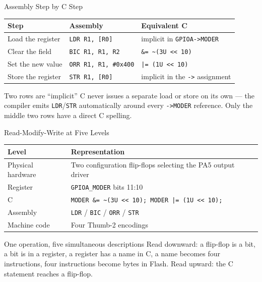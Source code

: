 \documentclass[9pt,aspectratio=169,xcolor=table]{beamer}
\begin{document}
\begin{frame}{Assembly Step by C Step}
    \begin{center}
    {\small
    \striped
    \begin{tabular}{@{}l l l@{}}
        \toprule
        \textbf{Step} & \textbf{Assembly} & \textbf{Equivalent C} \\
        \midrule
        Load the register & \texttt{LDR R1, [R0]} & implicit in \texttt{GPIOA->MODER} \\
        Clear the field & \texttt{BIC R1, R1, R2} & \texttt{\&= \textasciitilde(3U << 10)} \\
        Set the new value & \texttt{ORR R1, R1, \#0x400} & \texttt{|= (1U << 10)} \\
        Store the register & \texttt{STR R1, [R0]} & implicit in the \texttt{->} assignment \\
        \bottomrule
    \end{tabular}}
    \end{center}

    \vspace{3mm}
    \begin{block}{Two rows are ``implicit''}
        C never issues a separate load or store on its own --- the compiler
        emits \texttt{LDR}/\texttt{STR} automatically around every
        \texttt{->MODER} reference. Only the middle two rows have a direct
        C spelling.
    \end{block}
\end{frame}

\begin{frame}{Read-Modify-Write at Five Levels}
    \begin{center}
    {\small
    \striped
    \begin{tabular}{@{}l R{.65\textwidth}@{}}
        \toprule
        \textbf{Level} & \textbf{Representation} \\
        \midrule
        Physical hardware & Two configuration flip-flops selecting the PA5 output driver \\
        Register          & \texttt{GPIOA\_MODER} bits 11:10 \\
        C                 & \texttt{MODER \&= \textasciitilde(3U << 10); MODER |= (1U << 10);} \\
        Assembly          & \texttt{LDR} / \texttt{BIC} / \texttt{ORR} / \texttt{STR} \\
        Machine code      & Four Thumb-2 encodings \\
        \bottomrule
    \end{tabular}}
    \end{center}

    \vspace{3mm}
    \begin{block}{One operation, five simultaneous descriptions}
        Read downward: a flip-flop is a bit, a bit is in a register, a
        register has a name in C, a name becomes four instructions, four
        instructions become bytes in Flash. Read upward: the C statement
        reaches a flip-flop.
    \end{block}
\end{frame}
\end{document}
